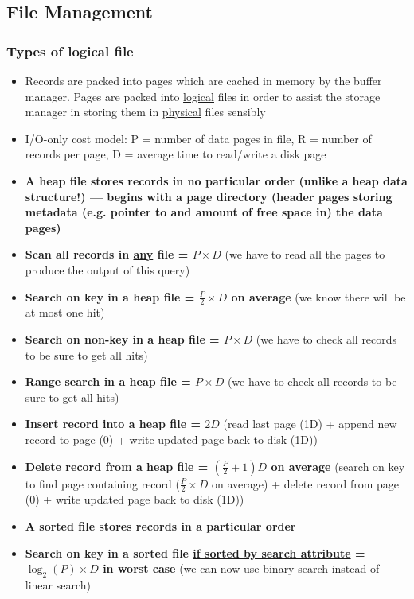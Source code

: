 \documentclass[20pt,a4paper,landscape]{extarticle}
\begin{document}
\begin{flushleft}
\subsection{File Management}
\subsubsection{Types of logical file}
\begin{itemize}
\item Records are packed into pages which are cached in memory by the buffer manager. Pages are packed into \underline{logical} files in order to assist the storage manager in storing them in \underline{physical} files sensibly
\item I/O-only cost model: P = number of data pages in file, R = number of records per page, D = average time to read/write a disk page
\item \textbf{A heap file stores records in no particular order (unlike a heap data structure!) --- begins with a page directory (header pages storing metadata (e.g. pointer to and amount of free space in) the data pages)}
\item \textbf{Scan all records in \underline{any} file = \boldmath$P \times D$} (we have to read all the pages to produce the output of this query)
\item \textbf{Search on key in a heap file = \boldmath$\frac{P}{2} \times D$ on average} (we know there will be at most one hit)
\item \textbf{Search on non-key in a heap file = \boldmath$P \times D$} (we have to check all records to be sure to get all hits)
\item \textbf{Range search in a heap file = \boldmath$P \times D$} (we have to check all records to be sure to get all hits)
\item \textbf{Insert record into a heap file = \boldmath$2D$} (read last page (1D) + append new record to page (0) + write updated page back to disk (1D))
\item \textbf{Delete record from a heap file = \boldmath$\left(\frac{P}{2} + 1\right)D$ on average} (search on key to find page containing record ($\frac{P}{2} \times D$ on average) + delete record from page (0) + write updated page back to disk (1D))
\clearpage
\item \textbf{A sorted file stores records in a particular order}
\item \textbf{Search on key in a sorted file \underline{if sorted by search attribute} = \boldmath$\log_2(P) \times D$ in worst case} (we can now use binary search instead of linear search)

\end{itemize}
\end{flushleft}
\end{document}
